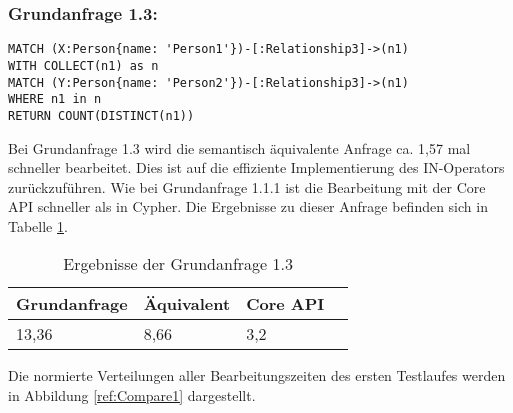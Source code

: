 \subsubsection{Grundanfrage 1.3:}
\begin{Verbatim}[frame=single]
MATCH (X:Person{name: 'Person1'})-[:Relationship3]->(n1) 
WITH COLLECT(n1) as n 
MATCH (Y:Person{name: 'Person2'})-[:Relationship3]->(n1) 
WHERE n1 in n
RETURN COUNT(DISTINCT(n1))
\end{Verbatim} 
\noindent Bei Grundanfrage 1.3 wird die semantisch äquivalente Anfrage ca. 1,57 mal schneller bearbeitet. Dies ist auf die effiziente Implementierung des IN-Operators zurückzuführen. Wie bei Grundanfrage 1.1.1 ist die Bearbeitung mit der Core API schneller als in Cypher.
Die Ergebnisse zu dieser Anfrage befinden sich in Tabelle	\ref{tab:Query1_3}.
\FloatBarrier
\begin{table}[h]
	\centering
		\begin{tabular}{ |p{3cm}|p{3cm}|p{3cm}|p{3cm}|  }
			\hline
			Grundanfrage & Äquivalent&Core API\\
			\hline
			 13,36    & 8,66 &  3,2\\
			\hline
		\end{tabular}
		\caption{Ergebnisse der Grundanfrage 1.3}
		\label{tab:Query1_3}
\end{table}
\FloatBarrier

\noindent Die normierte Verteilungen aller Bearbeitungszeiten des ersten Testlaufes werden in Abbildung \ref{ref:Compare1} dargestellt. 

\begin{center}
\label{ref:Compare1}
\end{center}
\FloatBarrier

